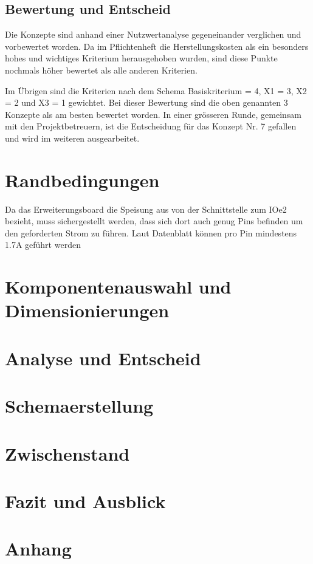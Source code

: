 \documentclass[]{article}
\begin{document}
\subsection{Bewertung und Entscheid}
Die Konzepte sind anhand einer Nutzwertanalyse gegeneinander verglichen und vorbewertet worden. Da im Pflichtenheft die Herstellungskosten als ein besonders
hohes und wichtiges Kriterium herausgehoben wurden, sind diese Punkte nochmals höher bewertet als alle anderen Kriterien. 

Im Übrigen sind die Kriterien nach dem Schema Basiskriterium = 4, X1 = 3, X2 = 2 und X3 = 1 gewichtet. Bei dieser Bewertung sind die oben genannten 3 Konzepte als 
am besten bewertet worden. In einer grösseren Runde, gemeinsam mit den Projektbetreuern, ist die Entscheidung für das Konzept Nr. 7 gefallen und wird im weiteren
ausgearbeitet.  

\section{Randbedingungen}

Da das Erweiterungsboard die Speisung aus von der Schnittstelle zum IOe2 bezieht, muss sichergestellt werden, dass sich dort auch genug Pins befinden um 
den geforderten Strom zu führen. Laut Datenblatt können pro Pin mindestens 1.7A geführt werden \cite[siehe][S. 11]{Datasheet_Interface}

\section{Komponentenauswahl und Dimensionierungen}
\section{Analyse und Entscheid}

\section{Schemaerstellung}

\section{Zwischenstand}

\section{Fazit und Ausblick}

\printbibliography

\section{Anhang}
\end{document}
